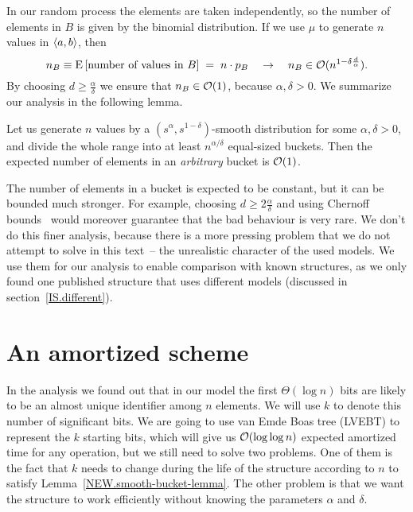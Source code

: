 In our random process the elements are taken independently, so the number of elements in $B$ is given by the binomial distribution. If we use $\mu$ to generate $n$ values in $\left\langle a,b\right\rangle$, then
\[	n_B \equiv \mathrm{E}\left[\text{number of values in }B\right]
	\;=\; n \cdot p_B \quad\rightarrow\quad
	n_B \in \mathcal O(n^{1 - \delta \frac d \alpha}).
\] By choosing $ d \ge \frac \alpha \delta$ we ensure that $n_B \in \mathcal O(1)$, because $\alpha,\delta > 0$. We summarize our analysis in the following lemma.
\begin{lemma} \label{NEW.smooth-bucket-lemma}
	Let us generate $n$ values by a $(s^\alpha,s^{1-\delta})$-smooth distribution for some $\alpha,\delta > 0$, and divide the whole range into at least $n^{\alpha / \delta}$ equal-sized buckets. Then the expected number of elements in an \emph{arbitrary} bucket is $\mathcal O(1)$.
\end{lemma}

The number of elements in a bucket is expected to be constant, but it can be bounded much stronger. For example, choosing $d \ge 2 \frac\alpha\delta$ and using Chernoff bounds~\cite[chapter~4.1]{randomAlgs} would moreover guarantee that the bad behaviour is very rare.
We don't do this finer analysis, because there is a more pressing problem that we do not attempt to solve in this text~-- the unrealistic character of the used models.
We use them for our analysis to enable comparison with known structures, as we only found one published structure that uses different models (discussed in section~\vref{IS.different}).

\section{An amortized scheme} \label{NEW.amortized-scheme}
In the analysis we found out that in our model the first $\Theta(\log n)$ bits are likely to be an almost unique identifier among $n$ elements. We will use $k$ to denote this number of significant bits.
We are going to use van Emde Boas tree (LVEBT) to represent the $k$ starting bits, which will give us $\mathcal O(\log\log n)$ expected amortized time for any operation, but we still need to solve two problems.
One of them is the fact that $k$ needs to change during the life of the structure according to $n$ to satisfy Lemma~\ref{NEW.smooth-bucket-lemma}. The other problem is that we want the structure to work efficiently without knowing the parameters $\alpha$ and $\delta$.

\def\Half{\frac 1 2}

